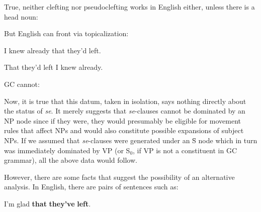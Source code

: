 \z

\z

\z

\z

\z

\z

\noindent True, neither clefting nor pseudoclefting works in English either, unless there is a head noun:

\z

\z
But English can front via topicalization:

\ea\label{ex:2:177}
I knew already that they'd left.
\z

\ea\label{ex:2:178}
That they'd left I knew already.
\z

\noindent GC cannot:

\z

\z

Now, it is true that this datum, taken in isolation, says nothing directly about the status of \textit{se}. It merely suggests that \textit{se}-clauses cannot be dominated by an NP node since if they were, they would presumably be eligible for movement rules that affect NPs and would also constitute possible expansions of subject NPs. If we assumed that \textit{se}-clauses were generated under an \=S node which in turn was immediately dominated by VP (or S$_0$, if VP is not a constituent in GC grammar), all the above data would follow.

However, there are some facts that suggest the possibility of
an alternative analysis. In English, there are pairs of sentences such as:

\ea\label{ex:2:181}
I'm glad \textbf{that} \textbf{they've} \textbf{left}.
\z

